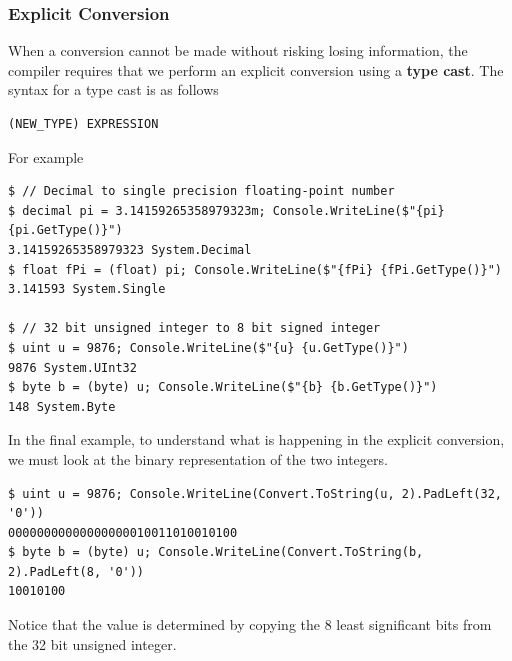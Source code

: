\documentclass{article}
\begin{document}
\subsubsection{Explicit Conversion}
When a conversion cannot be made without risking losing information,
the compiler requires that we perform an explicit conversion using a \textbf{type cast}.
The syntax for a type cast is as follows
\begin{lstlisting}
(NEW_TYPE) EXPRESSION
\end{lstlisting}
For example
\begin{lstlisting}
$ // Decimal to single precision floating-point number
$ decimal pi = 3.14159265358979323m; Console.WriteLine($"{pi} {pi.GetType()}")
3.14159265358979323 System.Decimal
$ float fPi = (float) pi; Console.WriteLine($"{fPi} {fPi.GetType()}")
3.141593 System.Single

$ // 32 bit unsigned integer to 8 bit signed integer
$ uint u = 9876; Console.WriteLine($"{u} {u.GetType()}")
9876 System.UInt32
$ byte b = (byte) u; Console.WriteLine($"{b} {b.GetType()}")
148 System.Byte
\end{lstlisting}
In the final example, to understand what is happening in the explicit conversion,
we must look at the binary representation of the two integers.
\begin{lstlisting}
$ uint u = 9876; Console.WriteLine(Convert.ToString(u, 2).PadLeft(32, '0'))
00000000000000000010011010010100
$ byte b = (byte) u; Console.WriteLine(Convert.ToString(b, 2).PadLeft(8, '0'))
10010100
\end{lstlisting}
Notice that the value is determined by copying the 8 least significant bits
from the 32 bit unsigned integer.
\end{document}
